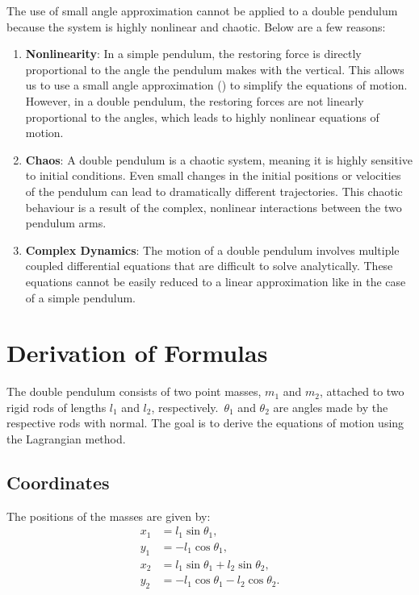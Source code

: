 \documentclass{article}
\begin{document}
The use of small angle approximation cannot be applied to a double pendulum because the system is highly nonlinear and chaotic. Below are a few reasons:

\begin{enumerate}
    \item \textbf{Nonlinearity}: In a simple pendulum, the restoring force is directly proportional to the angle the pendulum makes with the vertical. This allows us to use a small angle approximation () to simplify the equations of motion. However, in a double pendulum, the restoring forces are not linearly proportional to the angles, which leads to highly nonlinear equations of motion. 
    \item \textbf{Chaos}: A double pendulum is a chaotic system, meaning it is highly sensitive to initial conditions. Even small changes in the initial positions or velocities of the pendulum can lead to dramatically different trajectories. This chaotic behaviour is a result of the complex, nonlinear interactions between the two pendulum arms.
    \item \textbf{Complex Dynamics}: The motion of a double pendulum involves multiple coupled differential equations that are difficult to solve analytically. These equations cannot be easily reduced to a linear approximation like in the case of a simple pendulum.
\end{enumerate}


\newpage
\section{Derivation of Formulas}
The double pendulum consists of two point masses, \(m_1\) and \(m_2\), attached to two rigid rods of lengths \(l_1\) and \(l_2\), respectively.\ \(\theta_1\) and \(\theta_2\) are angles made by the respective rods with normal. The goal is to derive the equations of motion using the Lagrangian method.
\subsection{Coordinates}

The positions of the masses are given by:
\[
\begin{aligned}
    x_1 &= l_1 \sin \theta_1, \\
    y_1 &= -l_1 \cos \theta_1, \\
    x_2 &= l_1 \sin \theta_1 + l_2 \sin \theta_2, \\
    y_2 &= -l_1 \cos \theta_1 - l_2 \cos \theta_2.
\end{aligned}
\]
\end{document}
